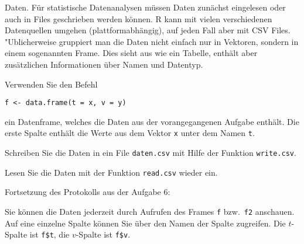 Daten. Für statistische Datenanalysen müssen Daten zunächst eingelesen
oder auch in Files geschrieben werden können.
R kann mit vielen verschiedenen Datenquellen umgehen
(plattformabhängig), auf jeden Fall aber mit CSV Files.
"Ublicherweise gruppiert man die Daten nicht einfach nur in Vektoren, sondern
in einem sogenannten Frame. Dies sieht aus wie ein Tabelle, enthält aber
zusätzlichen Informationen über Namen und Datentyp.
\begin{teilaufgaben}
\item Verwenden Sie den Befehl
\begin{verbatim}
f <- data.frame(t = x, v = y)
\end{verbatim}
ein Datenframe, welches die Daten aus der vorangegangenen
Aufgabe enthält. Die erste Spalte enthält die Werte aus dem Vektor
{\tt x} unter dem Namen {\tt t}.
\item Schreiben Sie die Daten in ein File {\tt daten.csv} mit Hilfe der
Funktion {\tt write.csv}.
\item Lesen Sie die Daten mit der Funktion {\tt read.csv} wieder ein.
\end{teilaufgaben}


\begin{loesung}
Fortsetzung des Protokolls aus der Aufgabe 6:

Sie können die Daten jederzeit durch Aufrufen des Frames {\tt f}
bzw.~{\tt f2} anschauen. Auf eine einzelne Spalte können Sie über
den Namen der Spalte zugreifen. Die $t$-Spalte ist {\tt f\$t},
die $v$-Spalte ist {\tt f\$v}.
\end{loesung}

